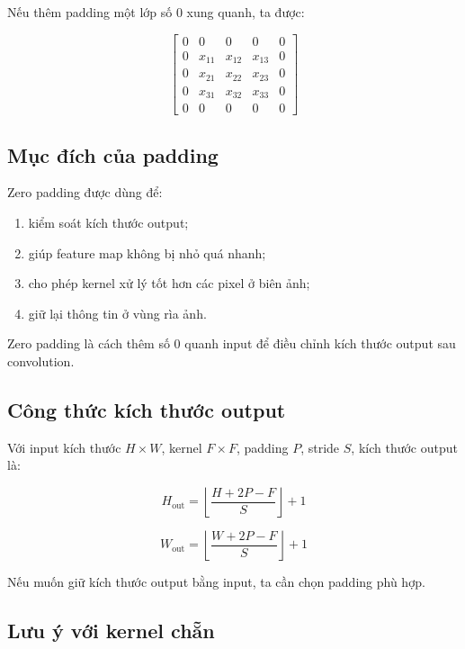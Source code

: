 Nếu thêm padding một lớp số 0 xung quanh, ta được:

\[
    \begin{bmatrix}
    0 & 0 & 0 & 0 & 0\\
    0 & x_{11} & x_{12} & x_{13} & 0\\
    0 & x_{21} & x_{22} & x_{23} & 0\\
    0 & x_{31} & x_{32} & x_{33} & 0\\
    0 & 0 & 0 & 0 & 0
    \end{bmatrix}
\]

\subsection{Mục đích của padding}

Zero padding được dùng để:

\begin{enumerate}[label=\arabic*.]
    \item kiểm soát kích thước output;
    \item giúp feature map không bị nhỏ quá nhanh;
    \item cho phép kernel xử lý tốt hơn các pixel ở biên ảnh;
    \item giữ lại thông tin ở vùng rìa ảnh.
\end{enumerate}

\begin{ghinho}
Zero padding là cách thêm số 0 quanh input để điều chỉnh kích thước output sau convolution.
\end{ghinho}

\subsection{Công thức kích thước output}

Với input kích thước $H\times W$, kernel $F\times F$, padding $P$, stride $S$, kích thước output là:

\[
    H_{\text{out}}
    =
    \left\lfloor
    \frac{H+2P-F}{S}
    \right\rfloor
    +1
\]

\[
    W_{\text{out}}
    =
    \left\lfloor
    \frac{W+2P-F}{S}
    \right\rfloor
    +1
\]

Nếu muốn giữ kích thước output bằng input, ta cần chọn padding phù hợp.

\subsection{Lưu ý với kernel chẵn}


